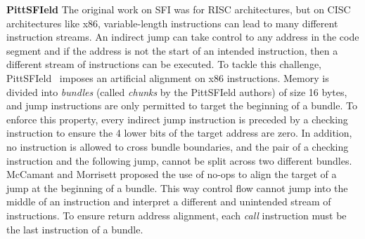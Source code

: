 \documentclass[conference]{IEEEtran}
\begin{document}
%
 
 
\textbf{PittSFIeld}
The original work on SFI was for RISC architectures, but on CISC architectures like x86, variable-length  instructions can  lead to many different instruction streams. An indirect jump can 
take control to any address in the code segment and if the address is not the start of an intended instruction, then a different stream of instructions  can be executed.
To tackle this challenge, PittSFIeld~\cite{mccamantPittS} imposes an artificial alignment on x86 instructions. Memory is divided into \textit{bundles} (called \textit{chunks} by the PittSFIeld authors) of size 16 bytes, and jump instructions 
are only permitted to target the beginning of a bundle. To enforce this property, every indirect jump instruction is preceded by a checking instruction to ensure the 4 lower
bits of the target address are zero. In addition, no instruction is allowed to cross bundle boundaries, and the pair of a checking instruction and the following jump, cannot
be split across two different bundles. McCamant and Morrisett proposed the use of no-ops to align the target of a jump at the beginning of a bundle. This way control flow cannot jump into the middle 
of an instruction and interpret a different and unintended stream of instructions. To ensure return address alignment, each \textit{call} instruction must be the last instruction 
of a bundle.
\end{document}
